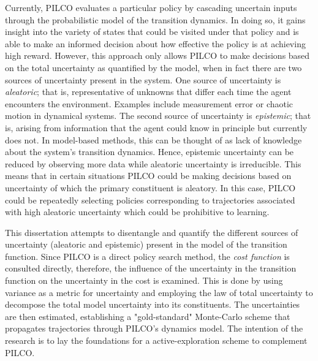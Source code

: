 Currently, PILCO evaluates a particular policy by cascading uncertain inputs through the probabilistic model of the transition dynamics. In doing so, it gains insight into the variety of states that could be visited under that policy and is able to make an informed decision about how effective the policy is at achieving high reward. However, this approach only allows PILCO to make decisions based on the total uncertainty as quantified by the model, when in fact there are two sources of uncertainty present in the system. One source of uncertainty is \textit{aleatoric}; that is, representative of unknowns that differ each time the agent encounters the environment. Examples include measurement error or chaotic motion in dynamical systems. The second source of uncertainty is \textit{epistemic}; that is, arising from information that the agent could know in principle but currently does not. In model-based methods, this can be thought of as lack of knowledge about the system's transition dynamics. Hence, epistemic uncertainty can be reduced by observing more data while aleatoric uncertainty is irreducible. This means that in certain situations PILCO could be making decisions based on uncertainty of which the primary constituent is aleatory. In this case, PILCO could be repeatedly selecting policies corresponding to trajectories associated with high aleatoric uncertainty which could be prohibitive to learning.

This dissertation attempts to disentangle and quantify the different sources of uncertainty (aleatoric and epistemic) present in the model of the transition function. Since PILCO is a direct policy search method, the \textit{cost function} is consulted directly, therefore, the influence of the uncertainty in the transition function on the uncertainty in the cost is examined. This is done by using variance as a metric for uncertainty and employing the law of total uncertainty to decompose the total model uncertainty into its constituents. The uncertainties are then estimated, establishing a "gold-standard" Monte-Carlo scheme that propagates trajectories through PILCO's dynamics model. The intention of the research is to lay the foundations for a active-exploration scheme to complement PILCO. 



\nomenclature[g-p]{$\pi$}{ $\simeq 3.14\ldots$}                                             %

